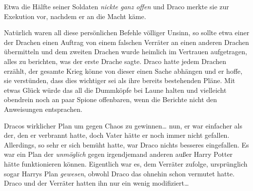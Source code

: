 Etwa die Hälfte seiner Soldaten \emph{nickte ganz offen} und Draco merkte sie zur Exekution vor, nachdem er an die Macht käme.

Natürlich waren all diese persönlichen Befehle völliger Unsinn, so sollte etwa einer der Drachen einen Auftrag von einem falschen Verräter an einen anderen Drachen übermitteln und dem zweiten Drachen wurde heimlich im Vertrauen aufgetragen, alles zu berichten, was der erste Drache sagte. Draco hatte jedem Drachen erzählt, der gesamte Krieg könne von dieser einen Sache abhängen und er hoffe, sie verstünden, dass dies wichtiger sei als ihre bereits bestehenden Pläne. Mit etwas Glück würde das all die Dummköpfe bei Laune halten und vielleicht obendrein noch an paar Spione offenbaren, wenn die Berichte nicht den Anweisungen entsprachen.

Dracos wirklicher Plan um gegen Chaos zu gewinnen… nun, er war einfacher als der, den er verbrannt hatte, doch Vater hätte er noch immer nicht gefallen. Allerdings, so sehr er sich bemüht hatte, war Draco nichts besseres eingefallen. Es war ein Plan der \emph{unmöglich} gegen irgendjemand anderen außer Harry Potter hätte funktionieren können. Eigentlich war es, dem Verräter zufolge, ursprünglich sogar Harrys Plan \emph{gewesen}, obwohl Draco das ohnehin schon vermutet hatte. Draco und der Verräter hatten ihn nur ein wenig modifiziert…

\later

